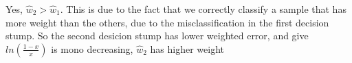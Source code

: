 \begin{answer}

Yes, $\hat{w}_2 > \hat{w}_1$. This is due to the fact that we correctly classify a sample that has more weight than the others, due to the misclassification in the first decision stump. So the second desicion stump has lower weighted error, and give $ln(\frac{1-x}{x})$ is mono decreasing, $\hat{w}_2$ has higher weight
\end{answer}